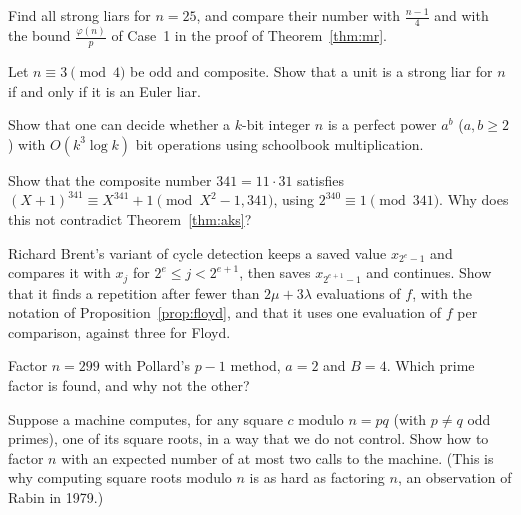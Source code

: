 \begin{exercise}[$\star$]\label{ex:liars25}
Find all strong liars for $n=25$, and compare their number with $\frac{n-1}4$ and with the bound $\frac{\varphi(n)}p$ of Case~1 in the proof of Theorem~\ref{thm:mr}.
\end{exercise}

\begin{exercise}[$\star\star$]\label{ex:eulerstrong}
Let $n\equiv3\pmod4$ be odd and composite. Show that a unit is a strong liar for $n$ if and only if it is an Euler liar.
\end{exercise}

\begin{exercise}[$\star$]\label{ex:perfectpower}
Show that one can decide whether a $k$-bit integer $n$ is a perfect power $a^b$ ($a,b\ge2$) with $O(k^3\log k)$ bit operations using schoolbook multiplication.
\end{exercise}

\begin{exercise}[$\star$]\label{ex:aksnecessary}
Show that the composite number $341=11\cdot31$ satisfies $(X+1)^{341}\equiv X^{341}+1\pmod{X^2-1,341}$, using $2^{340}\equiv1\pmod{341}$. Why does this not contradict Theorem~\ref{thm:aks}?
\end{exercise}

\begin{exercise}[$\star\star$]\label{ex:brent}
Richard Brent's variant of cycle detection keeps a saved value $x_{2^e-1}$ and compares it with $x_j$ for $2^e\le j<2^{e+1}$, then saves $x_{2^{e+1}-1}$ and continues. Show that it finds a repetition after fewer than $2\mu+3\lambda$ evaluations of $f$, with the notation of Proposition~\ref{prop:floyd}, and that it uses one evaluation of $f$ per comparison, against three for Floyd.
\end{exercise}

\begin{exercise}[$\star$]\label{ex:pminus1}
Factor $n=299$ with Pollard's $p-1$ method, $a=2$ and $B=4$. Which prime factor is found, and why not the other?
\end{exercise}

\begin{exercise}[$\star\star$]\label{ex:sqrtoracle}
Suppose a machine computes, for any square $c$ modulo $n=pq$ (with $p\ne q$ odd primes), one of its square roots, in a way that we do not control. Show how to factor $n$ with an expected number of at most two calls to the machine. (This is why computing square roots modulo $n$ is as hard as factoring $n$, an observation of Rabin in 1979.)
\end{exercise}


